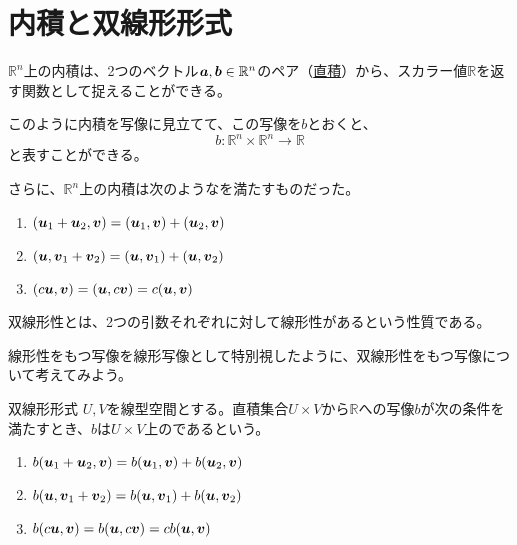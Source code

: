 \documentclass[../../../topic_linear-algebra]{subfiles}
\begin{document}
\sectionline
\section{内積と双線形形式}

$\mathbb{R}^n$上の内積は、2つのベクトル$\vb*{a}, \vb*{b} \in \mathbb{R}^n$のペア（\hyperref[def:cartesian-product]{直積}）から、スカラー値$\mathbb{R}$を返す関数として捉えることができる。

このように内積を写像に見立てて、この写像を$b$とおくと、
\begin{equation*}
  b \colon \mathbb{R}^n \times \mathbb{R}^n \to \mathbb{R}
\end{equation*}
と表すことができる。

\br

さらに、$\mathbb{R}^n$上の内積は次のようなを満たすものだった。

\begin{enumerate}[label=\romanlabel]
  \item $(\vb*{u}_1 + \vb*{u}_2, \vb*{v}) = ( \vb*{u}_1, \vb*{v}) + ( \vb*{u}_2, \vb*{v})$
  \item $(\vb*{u}, \vb*{v}_1 + \vb*{v}_2) = (\vb*{u}, \vb*{v}_1) + (\vb*{u}, \vb*{v}_2)$
  \item $(c\vb*{u}, \vb*{v}) = (\vb*{u}, c\vb*{v}) = c(\vb*{u}, \vb*{v})$
\end{enumerate}

双線形性とは、2つの引数それぞれに対して線形性があるという性質である。

線形性をもつ写像を線形写像として特別視したように、双線形性をもつ写像について考えてみよう。

\begin{definition}{双線形形式}\label{def:bilinear-form}
  $U,V$を線型空間とする。直積集合$U \times V$から$\mathbb{R}$への写像$b$が次の条件を満たすとき、$b$は$U \times V$上のであるという。
  \begin{enumerate}[label=\romanlabel]
    \item $b(\vb*{u}_1 + \vb*{u}_2, \vb*{v}) = b(\vb*{u}_1, \vb*{v}) + b(\vb*{u}_2, \vb*{v})$
    \item $b(\vb*{u}, \vb*{v}_1 + \vb*{v}_2) = b(\vb*{u}, \vb*{v}_1) + b(\vb*{u}, \vb*{v}_2)$
    \item $b(c\vb*{u}, \vb*{v}) = b(\vb*{u}, c\vb*{v}) = cb(\vb*{u}, \vb*{v})$
  \end{enumerate}
\end{definition}
\end{document}
